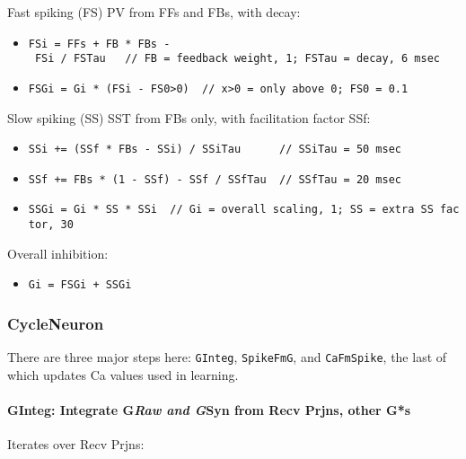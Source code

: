 \documentclass[11pt,twoside]{article}
\newif\myifpdf
\begin{document}
Fast spiking (FS) PV from FFs and FBs, with decay:

\begin{itemize}
\tightlist
\item
  \texttt{FSi\ =\ FFs\ +\ FB\ *\ FBs\ -\ FSi\ /\ FSTau\ \ \ //\ FB\ =\ feedback\ weight,\ 1;\ FSTau\ =\ decay,\ 6\ msec}
\item
  \texttt{FSGi\ =\ Gi\ *\ (\textbar{}FSi\ -\ FS0\textbar{}\textgreater{}0)\ \ //\ \textbar{}x\textbar{}\textgreater{}0\ =\ only\ above\ 0;\ FS0\ =\ 0.1}
\end{itemize}

Slow spiking (SS) SST from FBs only, with facilitation factor SSf:

\begin{itemize}
\tightlist
\item
  \texttt{SSi\ +=\ (SSf\ *\ FBs\ -\ SSi)\ /\ SSiTau\ \ \ \ \ \ //\ SSiTau\ =\ 50\ msec}
\item
  \texttt{SSf\ +=\ FBs\ *\ (1\ -\ SSf)\ -\ SSf\ /\ SSfTau\ \ //\ SSfTau\ =\ 20\ msec}
\item
  \texttt{SSGi\ =\ Gi\ *\ SS\ *\ SSi\ \ //\ Gi\ =\ overall\ scaling,\ 1;\ SS\ =\ extra\ SS\ factor,\ 30}
\end{itemize}

Overall inhibition:

\begin{itemize}
\tightlist
\item
  \texttt{Gi\ =\ FSGi\ +\ SSGi}
\end{itemize}

\hypertarget{cycleneuron}{%
\subsubsection{CycleNeuron}\label{cycleneuron}}

There are three major steps here: \texttt{GInteg}, \texttt{SpikeFmG},
and \texttt{CaFmSpike}, the last of which updates Ca values used in
learning.

\hypertarget{ginteg-integrate-graw-and-gsyn-from-recv-prjns-other-gs}{%
\paragraph{\texorpdfstring{GInteg: Integrate G\emph{Raw and G}Syn from
Recv Prjns, other
G*s}{GInteg: Integrate GRaw and GSyn from Recv Prjns, other G*s}}\label{ginteg-integrate-graw-and-gsyn-from-recv-prjns-other-gs}}

Iterates over Recv Prjns:
\end{document}
